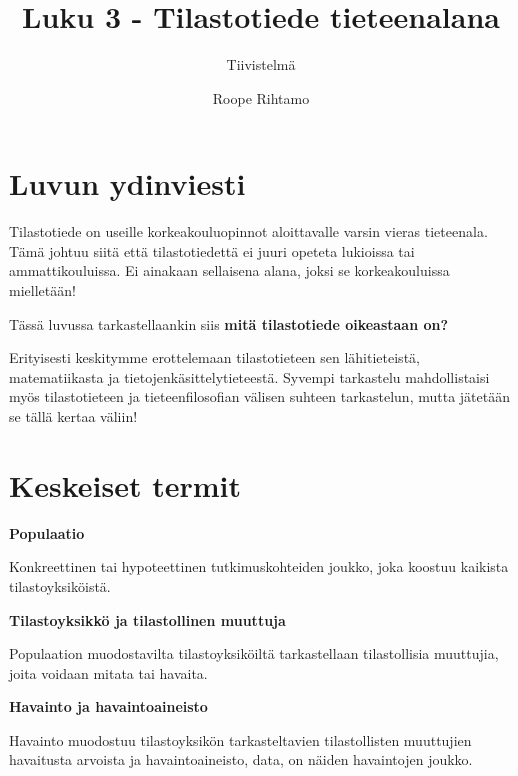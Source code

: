 \documentclass[
]{report}
\title{Luku 3 - Tilastotiede tieteenalana}
\subtitle{Tiivistelmä}
\author{Roope Rihtamo}
\date{}
\begin{document}
\maketitle
\ifdefined\Shaded\renewenvironment{Shaded}{\begin{tcolorbox}[borderline west={3pt}{0pt}{shadecolor}, interior hidden, boxrule=0pt, sharp corners, enhanced, breakable, frame hidden]}{\end{tcolorbox}}\fi

\hypertarget{luvun-ydinviesti}{%
\section{Luvun ydinviesti}\label{luvun-ydinviesti}}

Tilastotiede on useille korkeakouluopinnot aloittavalle varsin vieras
tieteenala. Tämä johtuu siitä että tilastotiedettä ei juuri opeteta
lukioissa tai ammattikouluissa. Ei ainakaan sellaisena alana, joksi se
korkeakouluissa mielletään!

Tässä luvussa tarkastellaankin siis \textbf{mitä tilastotiede oikeastaan
on?}

Erityisesti keskitymme erottelemaan tilastotieteen sen lähitieteistä,
matematiikasta ja tietojenkäsittelytieteestä. Syvempi tarkastelu
mahdollistaisi myös tilastotieteen ja tieteenfilosofian välisen suhteen
tarkastelun, mutta jätetään se tällä kertaa väliin!

\hypertarget{keskeiset-termit}{%
\section{Keskeiset termit}\label{keskeiset-termit}}

\begin{defblock}{}
\textbf{Populaatio}

Konkreettinen tai hypoteettinen tutkimuskohteiden joukko, joka koostuu
kaikista tilastoyksiköistä.

\end{defblock}

\begin{defblock}{}
\textbf{Tilastoyksikkö ja tilastollinen muuttuja}

Populaation muodostavilta tilastoyksiköiltä tarkastellaan tilastollisia
muuttujia, joita voidaan mitata tai havaita.

\end{defblock}

\begin{defblock}{}
\textbf{Havainto ja havaintoaineisto}

Havainto muodostuu tilastoyksikön tarkasteltavien tilastollisten
muuttujien havaitusta arvoista ja havaintoaineisto, data, on näiden
havaintojen joukko.

\end{defblock}
\end{document}
